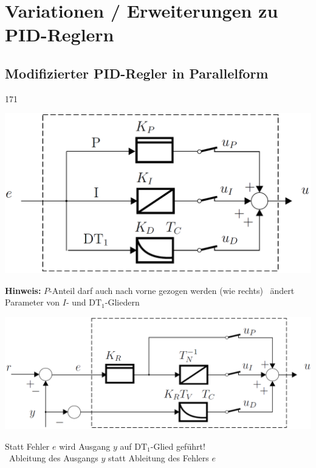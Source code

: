 \section{Variationen / Erweiterungen zu PID-Reglern}

\subsection{Modifizierter PID-Regler in Parallelform}{171}

\begin{minipage}[t]{0.4\columnwidth}
    \begin{center}
        \textbf{}
    \end{center}
    \includegraphics[width=\columnwidth]{images/pid_regler_aufbau.png}

    \textbf{Hinweis:} $P$-Anteil darf auch nach vorne gezogen werden (wie rechts) 
    \textrightarrow\ ändert Parameter von $I$- und $\text{DT}_1$-Gliedern
\end{minipage}
\hfill
\begin{minipage}[t]{0.55\columnwidth}
    \begin{center}
        \textbf{}
    \end{center}
    \includegraphics[width=\columnwidth]{images/modifizierter_pid_regler.png}

    Statt Fehler $e$ wird Ausgang $y$ auf $\text{DT}_1$-Glied geführt! \\
    \textrightarrow\ Ableitung des Ausgangs $y$ statt Ableitung des Fehlers $e$
\end{minipage}


